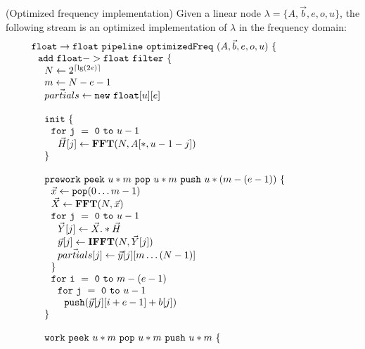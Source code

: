 \begin{transformation} (Optimized frequency implementation)
Given a linear node $\lambda = \{A, {\vec b}, e, o, u\}$, the
following stream is an optimized implementation of $\lambda$ in the
frequency domain: \\
\begin{equation} \nonumber
  \begin{array}{ll}

    {\tt float \rightarrow float}~{\tt pipeline~optimizedFreq~}(A, {\vec b}, e, o, u){\tt ~\{} & \hspace{40pt}\\
    ~~{\tt add~float->float~filter~\{}\\
    ~~~~N \leftarrow 2^{\lceil \lg(2e) \rceil} \\
    ~~~~m \leftarrow N-e-1 \\
    ~~~~\vec{partials} \leftarrow {\tt new~float}[u][e] \\
    \\
    ~~~~{\tt init}~{\tt \{} \\
    ~~~~~~{\tt for~j~=~0~to~}u-1\\
    ~~~~~~~~\vec{H}[j] \leftarrow \mathbf{FFT}(N,A[*,u-1-j]) \\
    ~~~~{\tt \}} \\
    \\
    ~~~~{\tt prework}~{\tt peek}~u*m~{\tt pop}~u*m~{\tt push}~u*(m-(e-1))~{\tt \{}\\
    ~~~~~~\vec{x} \leftarrow {\tt pop}(0 \dots m-1) \\
    ~~~~~~\vec{X} \leftarrow \mathbf{FFT} (N, \vec{x}) \\
    ~~~~~~{\tt for~j~=~0~to~}u-1\\
    ~~~~~~~~\vec{Y}[j] \leftarrow \vec{X} .* \vec{H} \\
    ~~~~~~~~\vec{y}[j] \leftarrow \mathbf{IFFT}(N, \vec{Y}[j]) \\
    ~~~~~~~~\vec{partials}[j] \leftarrow \vec{y}[j][m \dots (N-1)]\\
    ~~~~~~{\tt \}} \\
    ~~~~~~{\tt for~i~=~0~to~}m-(e-1)\\
    ~~~~~~~~{\tt for~j~=~0~to~}u-1\\
    ~~~~~~~~~~{\tt push}(\vec{y}[j][i+e-1] + b[j]) \\
    ~~~~{\tt \}} \\
    \\
    ~~~~{\tt work}~{\tt peek}~u*m~{\tt pop}~u*m~{\tt push}~u*m~{\tt \{} \\

\end{array}
\end{equation}
\end{transformation}
